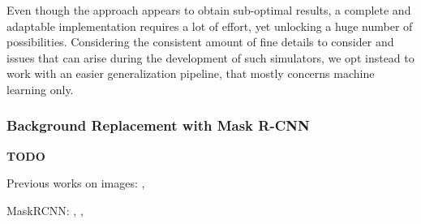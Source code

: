 Even though the approach appears to obtain sub-optimal results, a complete and adaptable implementation requires a lot of effort, yet unlocking a huge number of possibilities. Considering the consistent amount of fine details to consider and issues that can arise during the development of such simulators, we opt instead to work with an easier generalization pipeline, that mostly concerns machine learning only.


\subsubsection{Background Replacement with Mask R-CNN}
\label{subsec:sota-maskrcnn}

\textbf{TODO}

Previous works on images: \cite{yue2019domain}, \cite{Takahashi_2020}

MaskRCNN: \cite{he2018mask}, \cite{maskrcnn_explanation}, \cite{maskrcnn_arcgis}



